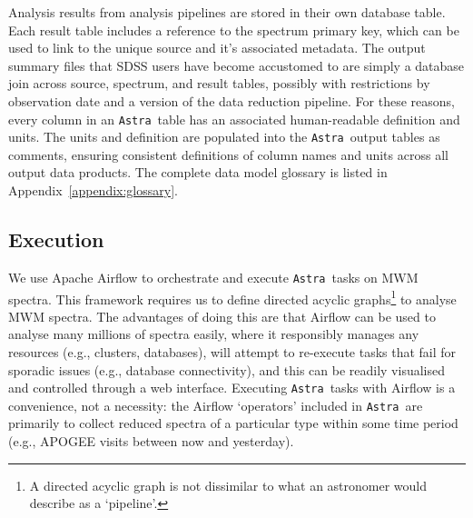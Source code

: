 \documentclass[modern]{aastex631}
\newcommand{\astra}{\texttt{Astra}}
\newcommand{\Astra}{\astra}
\begin{document}
Analysis results from analysis pipelines are stored in their own database table. Each result table includes a reference to the spectrum primary key, which can be used to link to the unique source and it's associated metadata. The output summary files that SDSS users have become accustomed to are simply a database join across source, spectrum, and result tables, possibly with restrictions by observation date and a version of the data reduction pipeline. For these reasons, every column in an \Astra\ table has an associated human-readable definition and units. The units and definition are populated into the \Astra\ output tables as comments, ensuring consistent definitions of column names and units across all output data products. The complete data model glossary is listed in Appendix~\ref{appendix:glossary}.





\subsection{Execution}

We use Apache Airflow \citep{} to orchestrate and execute \Astra\ tasks on MWM spectra.
This framework requires us to define directed acyclic graphs\footnote{A directed acyclic graph is not dissimilar to what an astronomer would describe as a `pipeline'.} to analyse MWM spectra.
The advantages of doing this are that Airflow can be used to analyse many millions of spectra easily, where it responsibly manages any resources (e.g., clusters, databases), will attempt to re-execute tasks that fail for sporadic issues (e.g., database connectivity), and this can be readily visualised and controlled through a web interface. 
Executing \Astra\ tasks with Airflow is a convenience, not a necessity: the Airflow `operators' included in \Astra\ are primarily to collect reduced spectra of a particular type within some time period (e.g., APOGEE visits between now and yesterday).
\end{document}
